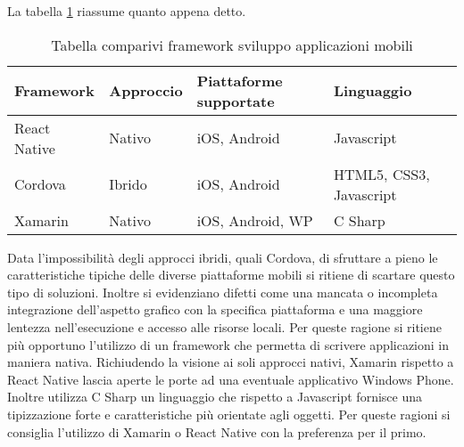  La tabella \ref{tab:comp-framework} riassume quanto appena detto.
\begin{table}[!h] %
    \caption{Tabella comparivi framework sviluppo applicazioni mobili}
    \label{tab:comp-framework}
    \begin{tabularx}{\textwidth}{llll}
    \hline
    \textbf{Framework} & \textbf{Approccio} & \textbf{Piattaforme supportate} &\textbf{Linguaggio}\\
    \hline
    React Native   & Nativo & iOS, Android & Javascript\\
    \hline
    Cordova   & Ibrido & iOS, Android & HTML5, CSS3, Javascript\\
    \hline
    Xamarin   & Nativo & iOS, Android, WP & C Sharp\\
    \hline
    \end{tabularx}
    \end{table}%
Data l’impossibilità degli approcci ibridi, quali Cordova, di sfruttare a pieno le caratteristiche tipiche delle diverse piattaforme mobili si ritiene di scartare questo tipo di soluzioni.
Inoltre si evidenziano difetti come una mancata o incompleta integrazione dell’aspetto grafico con la specifica piattaforma e una maggiore lentezza nell’esecuzione e accesso alle risorse locali.
Per queste ragione si ritiene più opportuno l’utilizzo di un framework che permetta di scrivere applicazioni in maniera nativa. 
Richiudendo la visione ai soli approcci nativi, Xamarin rispetto a React Native lascia aperte le porte ad una eventuale applicativo Windows Phone. Inoltre utilizza C Sharp un linguaggio che rispetto a Javascript fornisce una tipizzazione forte e caratteristiche più orientate agli oggetti. Per queste ragioni si consiglia l’utilizzo di Xamarin o React Native con la preferenza per il primo.
